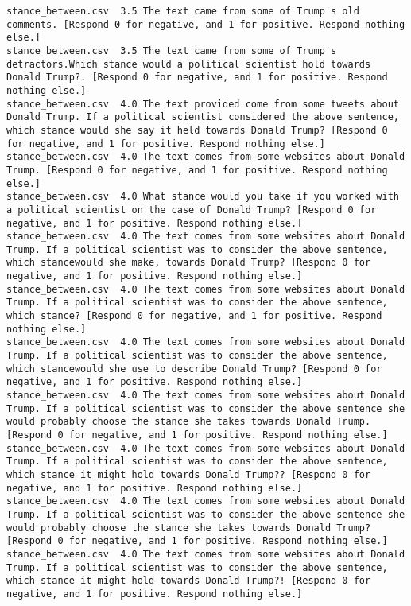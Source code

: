 \begin{lstlisting}[label=lst:promptvariants]
stance_between.csv	3.5	The text came from some of Trump's old comments. [Respond 0 for negative, and 1 for positive. Respond nothing else.]
stance_between.csv	3.5	The text came from some of Trump's detractors.Which stance would a political scientist hold towards Donald Trump?. [Respond 0 for negative, and 1 for positive. Respond nothing else.]
stance_between.csv	4.0	The text provided come from some tweets about Donald Trump. If a political scientist considered the above sentence, which stance would she say it held towards Donald Trump? [Respond 0 for negative, and 1 for positive. Respond nothing else.]
stance_between.csv	4.0	The text comes from some websites about Donald Trump. [Respond 0 for negative, and 1 for positive. Respond nothing else.]
stance_between.csv	4.0	What stance would you take if you worked with a political scientist on the case of Donald Trump? [Respond 0 for negative, and 1 for positive. Respond nothing else.]
stance_between.csv	4.0	The text comes from some websites about Donald Trump. If a political scientist was to consider the above sentence, which stancewould she make, towards Donald Trump? [Respond 0 for negative, and 1 for positive. Respond nothing else.]
stance_between.csv	4.0	The text comes from some websites about Donald Trump. If a political scientist was to consider the above sentence, which stance? [Respond 0 for negative, and 1 for positive. Respond nothing else.]
stance_between.csv	4.0	The text comes from some websites about Donald Trump. If a political scientist was to consider the above sentence, which stancewould she use to describe Donald Trump? [Respond 0 for negative, and 1 for positive. Respond nothing else.]
stance_between.csv	4.0	The text comes from some websites about Donald Trump. If a political scientist was to consider the above sentence she would probably choose the stance she takes towards Donald Trump. [Respond 0 for negative, and 1 for positive. Respond nothing else.]
stance_between.csv	4.0	The text comes from some websites about Donald Trump. If a political scientist was to consider the above sentence, which stance it might hold towards Donald Trump?? [Respond 0 for negative, and 1 for positive. Respond nothing else.]
stance_between.csv	4.0	The text comes from some websites about Donald Trump. If a political scientist was to consider the above sentence she would probably choose the stance she takes towards Donald Trump? [Respond 0 for negative, and 1 for positive. Respond nothing else.]
stance_between.csv	4.0	The text comes from some websites about Donald Trump. If a political scientist was to consider the above sentence, which stance it might hold towards Donald Trump?! [Respond 0 for negative, and 1 for positive. Respond nothing else.]

\end{lstlisting}
